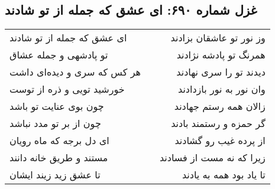 \begin{center}
\section*{غزل شماره ۶۹۰: ای عشق که جمله از تو شادند}
\label{sec:0690}
\begin{longtable}{l p{0.5cm} r}
ای عشق که جمله از تو شادند
&&
وز نور تو عاشقان بزادند
\\
تو پادشهی و جمله عشاق
&&
همرنگ تو پادشه نژادند
\\
هر کس که سری و دیده‌ای داشت
&&
دیدند تو را سری نهادند
\\
خورشید تویی و ذره از توست
&&
وان نور به نور بازدادند
\\
چون بوی عنایت تو باشد
&&
زالان همه رستم جهادند
\\
چون از بر تو مدد نباشد
&&
گر حمزه و رستمند بادند
\\
ای دل برجه که ماه رویان
&&
از پرده غیب رو گشادند
\\
مستند و طریق خانه دانند
&&
زیرا که نه مست از فسادند
\\
تا عشق زید زیند ایشان
&&
تا یاد بود همه به یادند
\\
\end{longtable}
\end{center}
